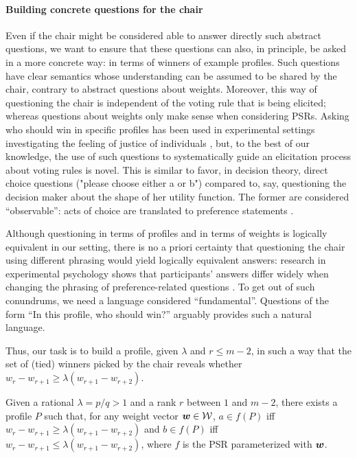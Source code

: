 \documentclass[runningheads]{llncs}
\theoremstyle{remark}
\begin{document}
\paragraph{Building concrete questions for the chair}
Even if the chair might be considered able to answer directly such abstract questions, we want to ensure that these questions can also, in principle, be asked in a more concrete way: in terms of winners of example profiles. Such questions have clear semantics whose understanding can be assumed to be shared by the chair, contrary to abstract questions about weights. 
Moreover, this way of questioning the chair is independent of the voting rule that is being elicited; whereas questions about weights only make sense when considering PSRs.
Asking who should win in specific profiles has been used in experimental settings investigating the feeling of justice of individuals \cite{Giritligil2005}, but, to the best of our knowledge, the use of such questions to systematically guide an elicitation process about voting rules is novel. 
This is similar to favor, in decision theory, direct choice questions ("please choose either a or b") compared to, say, questioning the decision maker about the shape of her utility function. The former are considered “observable”: acts of choice are translated to preference statements \cite[Ch.\ 1]{colell_microeconomic_1995}. 

Although questioning in terms of profiles and in terms of weights is logically equivalent in our setting, there is no a priori certainty that questioning the chair using different phrasing would yield logically equivalent answers: research in experimental psychology shows that participants’ answers differ widely when changing the phrasing of preference-related questions \cite{Lichtenstein2006}. To get out of such conundrums, we need a language considered “fundamental”. Questions of the form “In this profile, who should win?” arguably provides such a natural language.

Thus, our task is to build a profile, given $\lambda$ and $r ≤ m-2$, in such a way that the set of (tied) winners picked by the chair reveals whether $w_{r} - w_{r+1} \geq \lambda (w_{r+1} - w_{r+2})$.
\begin{proposition}\label{prop:chairQuestions}
	Given a rational $\lambda = p/q > 1$ and a rank $r$ between $1$ and $m - 2$, there exists a profile $P$ such that, for any weight vector $\bm{w} \in \mathcal{W}$, $a \in f(P)$ iff $w_{r} - w_{r+1} ≥ \lambda (w_{r+1} - w_{r+2})$ and $b \in f(P)$ iff $w_{r} - w_{r+1} ≤ \lambda (w_{r+1} - w_{r+2})$, where $f$ is the PSR parameterized with $\bm{w}$.
\end{proposition}
\end{document}
